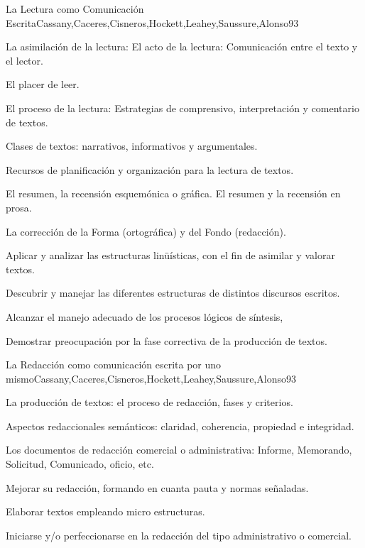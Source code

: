 \begin{syllabus}
\begin{unit}{La Lectura como Comunicación Escrita}{Cassany,Caceres,Cisneros,Hockett,Leahey,Saussure,Alonso}{9}{3}
\begin{topics}
   \item La asimilación de la lectura: El acto de la lectura: Comunicación entre el texto y el lector. 
   \item El placer de leer.  
   \item El proceso de la lectura: Estrategias de comprensivo, interpretación y comentario de textos.
   \item Clases de textos: narrativos, informativos y argumentales. 
   \item Recursos de planificación y organización para la lectura de textos.
   \item El resumen, la recensión esquemónica o gráfica. El resumen y la recensión en prosa.
   \item La corrección de la Forma (ortográfica) y del Fondo (redacción).
\end{topics}
\begin{learningoutcomes}
   \item Aplicar y analizar las estructuras linüísticas, con el fin de asimilar y valorar textos.
   \item Descubrir y manejar las diferentes estructuras de distintos discursos escritos.
   \item Alcanzar el manejo adecuado de los procesos lógicos de síntesis,
   \item Demostrar preocupación por la fase correctiva de la producción de textos.
\end{learningoutcomes}
\end{unit}

\begin{unit}{La Redacción como comunicación escrita por uno mismo}{Cassany,Caceres,Cisneros,Hockett,Leahey,Saussure,Alonso}{9}{3}
\begin{topics}
   \item La producción de textos: el proceso de redacción, fases y criterios.
   \item Aspectos redaccionales semánticos: claridad, coherencia, propiedad e integridad.
   \item Los documentos de redacción comercial o administrativa: Informe, Memorando, Solicitud, Comunicado, oficio, etc.
\end{topics}
\begin{learningoutcomes}
   \item Mejorar su redacción, formando en cuanta pauta y normas señaladas.
   \item Elaborar textos empleando micro estructuras.
   \item Iniciarse y/o perfeccionarse en la redacción del tipo administrativo o comercial.
\end{learningoutcomes}
\end{unit}


\end{syllabus}
